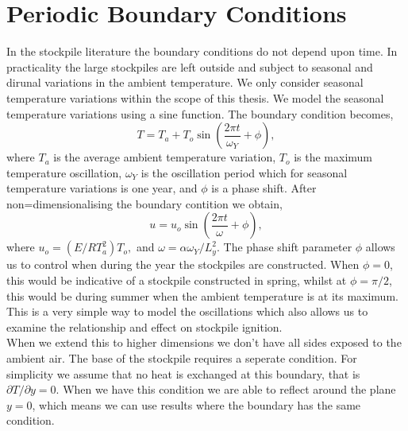 \section{Periodic Boundary Conditions}
In the stockpile literature the boundary conditions do not depend upon time. In practicality the large stockpiles are left outside and subject to seasonal and dirunal variations in the ambient temperature. We only consider seasonal temperature variations within the scope of this thesis. We model the seasonal temperature variations using a sine function. The boundary condition becomes,
\begin{equation}
T=T_a+T_o\sin\left(\frac{2\pi t}{\omega_Y}+\phi\right), \label{eq:PBC_D}
\end{equation}
where $T_a$ is the average ambient temperature variation, $T_o$ is the maximum temperature oscillation, $\omega_Y$ is the oscillation period which for seasonal temperature variations is one year, and $\phi$ is a phase shift. After non=dimensionalising the boundary contition we obtain,
\begin{equation}
u=u_o \sin\left(\frac{2\pi t}{\omega}+\phi \right),
\end{equation} 
where $u_o=\left(E/RT_a^2\right)T_o,$ and $\omega=\alpha \omega_Y/L_y^2.$ The phase shift parameter $\phi$ allows us to control when during the year the stockpiles are constructed. When $\phi=0$, this would be indicative of a stockpile constructed in spring, whilst at $\phi=\pi/2$, this would be during summer when the ambient temperature is at its maximum. This is a very simple way to model the oscillations which also allows us to examine the relationship and effect on stockpile ignition.\\

When we extend this to higher dimensions we don't have all sides exposed to the ambient air. The base of the stockpile requires a seperate condition. For simplicity we assume that no heat is exchanged at this boundary, that is $\partial T/\partial y =0$. When we have this condition we are able to reflect around the plane $y=0$, which means we can use results where the boundary has the same condition.
 
